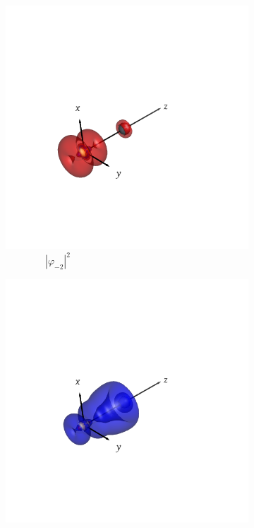 \documentclass[journal=inoraj,manuscript=article]{achemso}
\begin{document}
\begin{figure}[!h]
    \vspace{0.0cm}
    \begin{subfigure}[t]{0.32\textwidth}
        \centering
        \includegraphics[width=\linewidth]{./AuPb+/nocv-3.png}
        \caption*{\ \ \ \ \ \ \ \ $|\varphi_{-2}|^2$}
    \end{subfigure}
    \hfill
    \begin{subfigure}[t]{0.32\textwidth}
        \centering
        \includegraphics[width=\linewidth]{./AuPb+/nocv+3.png}

\end{subfigure}
\end{figure}
\end{document}
